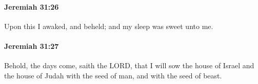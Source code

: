 		\paragraph{Jeremiah 31:26} %
			\label{JEREMIAH-31-26}

			Upon this I awaked, and beheld; and my sleep was sweet unto me.


		\paragraph{Jeremiah 31:27} %
			\label{JEREMIAH-31-27}

			Behold, the days come, saith the LORD, that I will sow the house of Israel and the house of Judah with the seed of man, and with the seed of beast.


